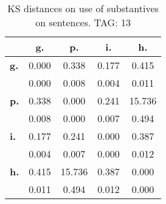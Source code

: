 \begin{table}[h!]
\begin{center}
\begin{tabular}{| l || c | c | c | c |}\hline
 & {\bf g.} & {\bf p.} & {\bf i.} & {\bf h.} \\\hline\hline
{\bf g.} & 0.000 & 0.338 & 0.177 & 0.415 \\
{\bf } & 0.000 & 0.008 & 0.004 & 0.011 \\\hline
{\bf p.} & 0.338 & 0.000 & 0.241 & 15.736 \\
{\bf } & 0.008 & 0.000 & 0.007 & 0.494 \\\hline
{\bf i.} & 0.177 & 0.241 & 0.000 & 0.387 \\
{\bf } & 0.004 & 0.007 & 0.000 & 0.012 \\\hline
{\bf h.} & 0.415 & 15.736 & 0.387 & 0.000 \\
{\bf } & 0.011 & 0.494 & 0.012 & 0.000 \\\hline
\end{tabular}
\caption{KS distances on use of substantives on sentences. TAG: 13}
\end{center}
\end{table}
